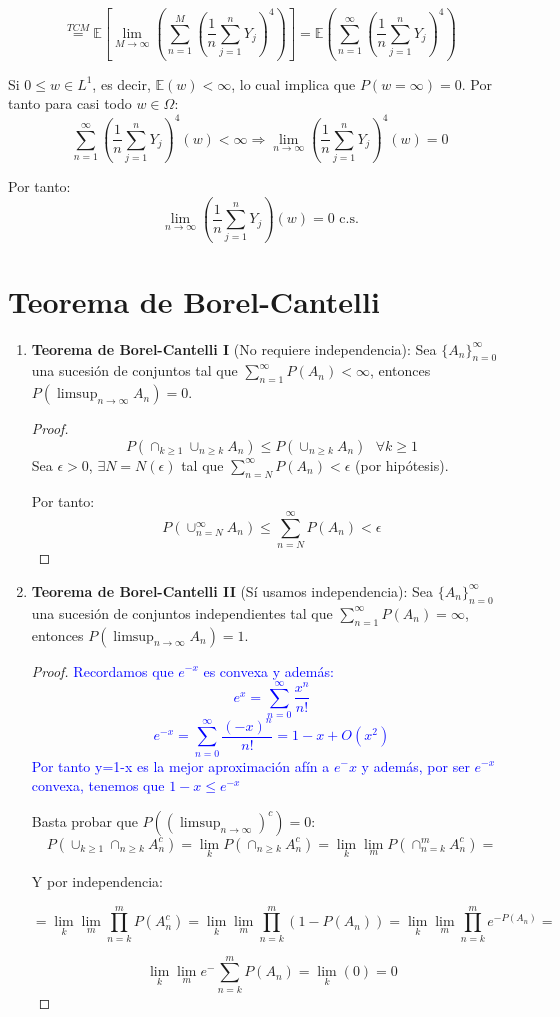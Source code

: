 \documentclass{apuntes}
\begin{document}
\[
\stackrel{TCM}{=} \mathbb{E}\left[\lim_{M \rightarrow \infty}\left(\sum_{n=1}^{M}(\frac{1}{n}\sum_{j=1}^{n} Y_j)^4 \right)  \right] = \mathbb{E}\left(\sum_{n=1}^{\infty}(\frac{1}{n}\sum_{j=1}^{n} Y_j)^4 \right)
\]

Si $0 \leq w \in L^1$, es decir, $\mathbb{E}(w) < \infty$, lo cual implica que $P(w = \infty)=0$. Por tanto para casi todo $w \in \Omega$:
\[
\sum_{n=1}^{\infty}(\frac{1}{n}\sum_{j=1}^{n}Y_j)^4 (w) < \infty  \Rightarrow \lim_{n \rightarrow \infty}(\frac{1}{n}\sum_{j=1}^{n}Y_j)^4 (w) = 0
\]

Por tanto:
\[
\lim_{n \rightarrow \infty}(\frac{1}{n}\sum_{j=1}^{n}Y_j) (w) = 0 \text{ c.s.}
\]

\section{Teorema de Borel-Cantelli}
\begin{enumerate}
\item \textbf{Teorema de Borel-Cantelli I} (No requiere independencia): Sea $\{A_n\}_{n=0}^{\infty}$ una sucesión de conjuntos tal que $\sum_{n=1}^{\infty}P(A_n)< \infty$, entonces $P(\limsup_{n \rightarrow \infty}A_n)=0$.
\begin{proof}
\[
P(\cap_{k\geq 1}\cup_{n\geq k}A_n) \leq P(\cup_{n\geq k}A_n) \text{ } \forall k\geq 1
\]
Sea $\epsilon >0$, $\exists N=N(\epsilon)$ tal que $ \sum_{n=N}^{\infty}P(A_n)<\epsilon$ (por hipótesis).

Por tanto:
\[
P(\cup_{n=N}^{\infty}A_n) \leq \sum_{n=N}^{\infty}P(A_n)<\epsilon
\]
\end{proof}

\item \textbf{Teorema de Borel-Cantelli II} (Sí usamos independencia): Sea $\{A_n\}_{n=0}^{\infty}$ una sucesión de conjuntos independientes tal que $\sum_{n=1}^{\infty}P(A_n)= \infty$, entonces $P(\limsup_{n \rightarrow \infty}A_n)=1$.

\begin{proof}

\textcolor{blue}{Recordamos que $e^{-x}$ es convexa y además:
\[
e^x=\sum_{n=0}^{\infty}\frac{x^n}{n!}
\]
\[
e^{-x}=\sum_{n=0}^{\infty}\frac{(-x)^n}{n!}=1-x+O(x^2)
\]
Por tanto y=1-x es la mejor aproximación afín a $e^-x$ y además, por ser $e^{-x}$ convexa, tenemos que $1-x \leq e^{-x}$
}

Basta probar que $P((\limsup_{n \rightarrow \infty})^c)=0$:
\[
P(\cup_{k \geq 1}\cap_{n \geq k}A_n^c)= \lim_k P(\cap_{n\geq k}A_n^c)= \lim_k \lim_m P(\cap_{n=k}^m A_n^c)=
\]

Y por independencia:

\[
=\lim_k \lim_m \prod_{n=k}^m P(A_n^c)=\lim_k \lim_m \prod_{n=k}^m (1-P(A_n))= \lim_k \lim_m \prod_{n=k}^m e^{-P(A_n)}=
\]

\[
\lim_k \lim_m e^-\sum_{n=k}^m P(A_n)=\lim_k(0)=0
\]
\end{proof}

\end{enumerate}
\end{document}
